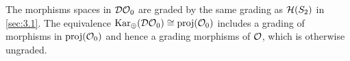 
\begin{remark}
    The morphisms spaces in $\mathcal{DO}_0$ are graded by the same grading as $\mathcal{H}(S_2)$ in \autoref{sec:3.1}. The equivalence $\operatorname{Kar_\oplus}(\mathcal{DO}_0) \cong \operatorname{proj}(\mathcal{O}_0)$ includes a grading of morphisms in $\operatorname{proj}(\mathcal{O}_0)$  and hence a grading morphisms of $\mathcal{O}$, which is otherwise ungraded.
\end{remark}

